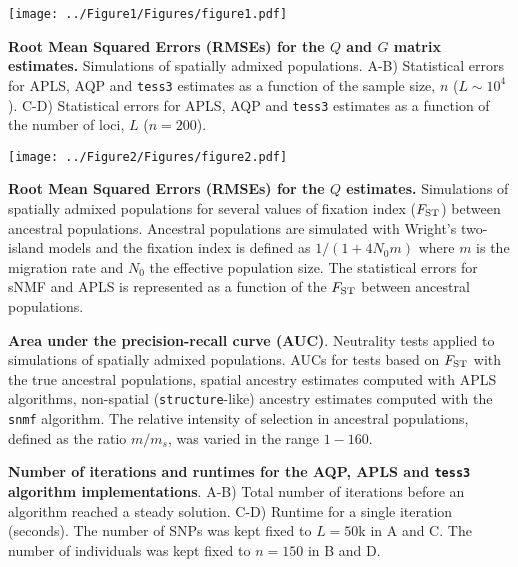 \clearpage 
\newpage


\begin{center}
\texttt{[image: ../Figure1/Figures/figure1.pdf]}
\end{center}  
 {\bf Root Mean Squared Errors (RMSEs) for the $Q$ and $G$ matrix estimates.} Simulations of spatially admixed populations. A-B) Statistical errors for APLS, AQP and {\tt tess3} estimates as a function of the sample size, $n$ ($L \sim 10^4$). C-D) Statistical errors for APLS, AQP and {\tt tess3} estimates as a function of the number of loci, $L$ ($n = 200$).

\clearpage 
\newpage


\begin{center}
\texttt{[image: ../Figure2/Figures/figure2.pdf]}
\end{center}  
 {\bf Root Mean Squared Errors (RMSEs) for the $Q$ estimates.} Simulations of spatially admixed populations for several values of fixation index ($F_{\rm ST}$) between ancestral populations. Ancestral populations are simulated with Wright’s two-island models and the fixation index is defined as $1 / (1 + 4 N_0 m)$ where $m$ is the migration rate and $N_0$ the effective population size. The statistical errors for sNMF and APLS is represented as a function of the $F_{\rm ST}$ between ancestral populations. 

\clearpage 
\newpage

\begin{center}
\end{center}
 {\bf Area under the precision-recall curve (AUC)}. Neutrality tests applied to simulations of spatially admixed populations. AUCs for tests based on $F_{\rm ST}$ with the true ancestral populations,  spatial ancestry estimates computed with APLS algorithms, non-spatial ({\tt structure}-like) ancestry estimates computed with the {\tt snmf} algorithm. The relative intensity of selection in ancestral populations, defined as the ratio $m/m_s$, was varied in the range $1-160$.


\clearpage 
\newpage

\begin{center}
\end{center}
 {\bf Number of iterations and runtimes for the AQP, APLS and {\tt tess3} algorithm implementations}. A-B)   Total number of iterations before an algorithm reached a steady solution. C-D) Runtime for a single iteration (seconds). The number of SNPs was kept fixed to $L = 50$k in A and C. The number of individuals was kept fixed to $n = 150$ in B and D.


